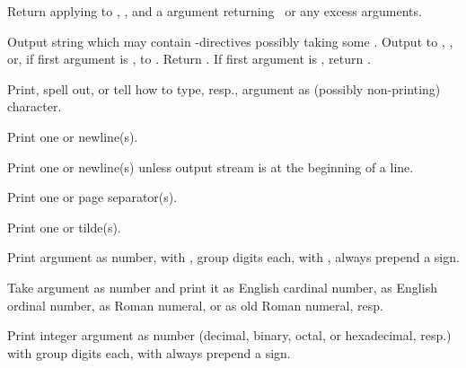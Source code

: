 \begin{LIST}{1cm}

  Return  applying  to
  , , and a  argument
  returning \NIL\ or any excess arguments. 

  Output string  which may
  contain \kwd{\TLD}-directives possibly taking some
  .
  Output to , , or, if first
  argument is \T, to . Return \retval{\NIL}. If
  first argument is \NIL, return . 

  \begin{LIST}{.5cm}

    Print, spell out, or tell how to type, resp., argument as
    (possibly non-printing) character.

    Print one or  newline(s).

    Print one or  newline(s) unless output stream is at the
    beginning of a line.

    Print one or  page separator(s).

    Print one or  tilde(s).

    Print argument as number, with \KWD{:}, group digits 
     each, with , always prepend a sign.

    Take argument as number and print it as English cardinal number,
    as English ordinal number, as Roman numeral, or as old Roman
    numeral, resp.

    Print integer argument as number (decimal, binary, octal, or
    hexadecimal, resp.) with \kwd{:} group digits 
     each, with  always prepend a sign.


\end{LIST}
\end{LIST}
